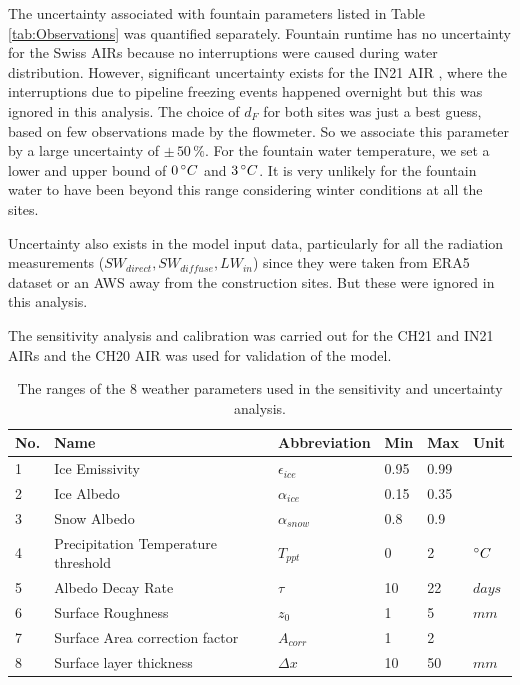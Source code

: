 \documentclass[utf8]{frontiersSCNS} %
\begin{document}
The uncertainty associated with fountain parameters listed in Table \ref{tab:Observations} was quantified
separately. Fountain runtime has no uncertainty for the Swiss AIRs because no interruptions were caused during
water distribution. However, significant uncertainty exists for the IN21 AIR , where the interruptions due to
pipeline freezing events happened overnight but this was ignored in this analysis. The choice of $d_F$ for both
sites was just a best guess, based on few observations made by the flowmeter. So we associate this parameter by a
large uncertainty of $\pm \,50\, \%$. For the fountain water temperature, we set a lower and upper bound of $0\,
	\degree C$ and $3\, \degree C$.  It is very unlikely for the fountain water to have been beyond this range
considering winter conditions at all the sites.

Uncertainty also exists in the model input data, particularly for all the radiation measurements ($SW_{direct},
	SW_{diffuse}, LW_{in}$) since they were taken from ERA5 dataset or an AWS away from the construction sites.
But these were ignored in this analysis.

The sensitivity analysis and calibration was carried out for the CH21 and IN21 AIRs and the CH20 AIR was used for
validation of the model.

\begin{table}
	\centering
	\caption{The ranges of the 8 weather parameters used in the sensitivity and uncertainty analysis.}
	\label{tab:parameters}
	\begin{tabular}{@{}llllll@{}}
		\toprule
		\textbf{No.} & \textbf{Name}                       & \textbf{Abbreviation} & \textbf{Min} & \textbf{Max} & \textbf{Unit} \\\midrule
		1            & Ice Emissivity                      & $\epsilon_{ice}$      & 0.95         & 0.99         &               \\
		2            & Ice Albedo                          & $\alpha_{ice}$        & 0.15         & 0.35         &               \\
		3            & Snow Albedo                         & $\alpha_{snow}$       & 0.8          & 0.9          &               \\
		4            & Precipitation Temperature threshold & $T_{ppt}$             & 0            & 2            & $\degree C$   \\
		5            & Albedo Decay Rate                   & $\tau$                & 10           & 22           & $days$        \\
		6            & Surface Roughness                   & $z_0$                 & 1            & 5            & $mm$          \\
		7            & Surface Area correction factor      & $A_{corr}$            & 1            & 2            &               \\
		8            & Surface layer thickness             & $\Delta x$            & 10           & 50           & $mm$          \\\bottomrule
	\end{tabular}
\end{table}
\end{document}

